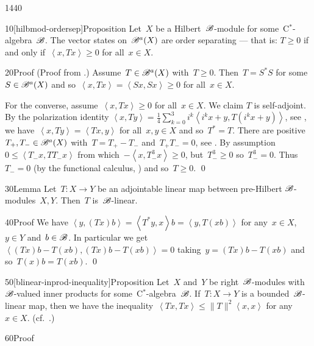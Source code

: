 \begin{parsec}{1440}%
\begin{point}{10}[hilbmod-ordersep]{Proposition}%
Let~$X$ be a Hilbert~$\mathscr{B}$-module for some~C$^*$-algebra~$\mathscr{B}$.
The vector states on~$\mathscr{B}^a(X)$ are order separating ---
that is: $T \geq 0$ if and only if~$\left<x,Tx\right> \geq 0$
for all~$x \in X$.
\begin{point}{20}{Proof}%
(Proof from \cite[lem.~4.1]{lance}.)
Assume~$T \in \mathscr{B}^a(X)$ with~$T \geq 0$.
Then~$T = S^*S$ for some~$S \in \mathscr{B}^a(X)$
    and so~$\left<x, Tx\right> = \left<Sx,Sx\right> \geq 0$
    for all~$x \in X$.

For the converse, assume~$\left<x, Tx\right> \geq 0$
    for all~$x \in X$.
We claim $T$ is self-adjoint.
By the polarization identity
$\left<x, Ty\right>
    = \frac{1}{4} \sum^3_{k=0} i^k \left< i^k x+y, T(i^k x+y)\right>$,
    see ,
    we have~$\left<x,Ty \right> = \left<Tx, y\right>$ for all~$x,y \in X$
    and so~$T^*=T$.
There are positive~$T_+,T_- \in \mathscr{B}^a(X)$
with~$T = T_+ - T_-$ and~$T_+T_- = 0$, see .
By assumption~$0 \leq \left<T_-x,TT_-x\right>$
    from which~$-\left<x,T_-^3x\right> \geq 0$,
    but~$T_-^3 \geq 0$ so~$T_-^3 = 0$.
    Thus~$T_- = 0$ (by the functional calculus, )
    and so~$T \geq 0$. \qed
\end{point}
\end{point}
\begin{point}{30}{Lemma}%
Let~$T\colon X \to Y$
    be an adjointable linear map
    between pre-Hilbert $\mathscr{B}$-modules~$X,Y$.
    Then~$T$ is~$\mathscr{B}$-linear. \cite[\S2]{paschke}
\begin{point}{40}{Proof}%
We have
    $\left<y, (Tx)b\right>
    =\left<T^*y, x\right>b
    =\left<y, T(xb)\right>$
for any~$x \in X$, $y \in Y$ and~$b \in \mathscr{B}$.
In particular we
get~$\left<(Tx)b-T(xb), (Tx)b-T(xb)\right>=0$
taking~$y = (Tx)b-T(xb)$
    and so~$T(x)b=T(xb)$. \qed
\end{point}
\end{point}
\begin{point}{50}[blinear-inprod-inequality]{Proposition}%
Let~$X$ and~$Y$ be right~$\mathscr{B}$-modules with~$\mathscr{B}$-valued
    inner products for some~C$^*$-algebra~$\mathscr{B}$.
If~$T \colon X \to Y$ is a bounded~$\mathscr{B}$-linear map,
    then we have the
        inequality~$\left<Tx,Tx\right>\leq \|T\|^2 \left<x,x\right>$
    for any~$x \in X$.  (cf.~\cite[rem.~2.9]{paschke}.)
\begin{point}{60}{Proof}

\end{point}
\end{point}
\end{parsec}
